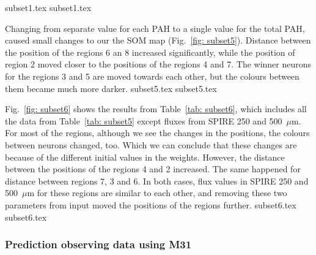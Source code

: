         {subset1.tex}
        {subset1.tex}

     

        Changing from separate value for each PAH to a single value for the total PAH, caused small changes to our the SOM map (Fig.~\ref{fig: subset5}). 
        Distance between the position of the regions 6 an 8 increased significantly, while the position of region 2 moved closer to the positions of the regions 4 and 7.
        The winner neurons for the regions 3 and 5 are moved towards each other, but the colours between them became much more darker. 
        {subset5.tex}
        {subset5.tex}

        Fig.~\ref{fig: subset6} shows the results from Table~\ref{tab: subset6}, which includes all the data from Table~\ref{tab: subset5} except fluxes from SPIRE 250 and 500~$\mu$m.
        For most of the regions, although we see the changes in the positions, the colours between neurons changed, too. 
        Which we can conclude that these changes are because of the different initial values in the weights.
        However, the distance between the positions of the regions 4 and 2 increased.
        The same happened for distance between regions 7, 3 and 6.
        In both cases, flux values in SPIRE 250 and 500~$\mu$m for these regions are similar to each other, and removing these two parameters from input moved the positions of the regions further. 
        {subset6.tex}
        {subset6.tex}

       
\subsubsection{Prediction observing data using M31}
       

